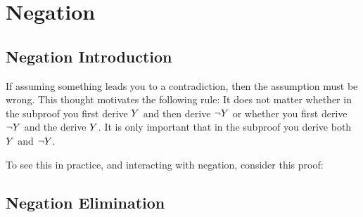 \section{Negation}
\subsection{Negation Introduction}
If assuming something leads you to a contradiction, then the assumption must be wrong. 
This thought motivates the following rule:
It does not matter whether in the subproof you first derive $Y$ and then derive $\neg Y$ or whether you first derive $\neg Y$ and the derive $Y$. It is only important that in the subproof you derive both $Y$ and $\neg Y$.

To see this in practice, and interacting with negation, consider this proof:

	\begin{pf}
		\open
		\close
	\end{pf}

\subsection{Negation Elimination} 



